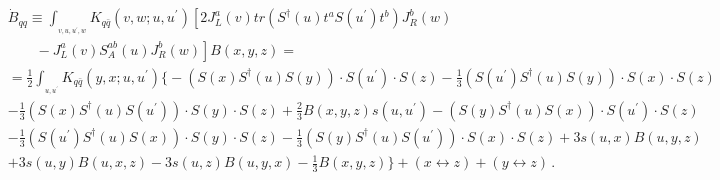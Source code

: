\documentclass[11pt,a4paper]{article}
\begin{document}
\begin{equation}\begin{split}
&
\dot B_{qq}\equiv
\int_{_{v,u,u^{\prime},w}}K_{q\bar{q}}(v,w;u,u^{\prime})\left[2J_{L}^{a}(v)tr\left(S^{\dagger}(u)t^{a}S(u^{\prime})t^{b}\right)J_{R}^{b}(w)\right.\\
&\left. \ \ \ \ \ \ \ \ \ -J_{L}^{a}(v)S_A^{ab}(u)J_{R}^{b}(w)\right]B(x,y,z)=\\
&=\frac{1}{2}\int_{_{u,u^{\prime}}}K_{q\bar{q}}(y,x;u,u^{\prime})\Big\{
-(S(x)S^{\dagger}(u)S(y))\cdot S(u^\prime)\cdot S(z) 
-\frac{1}{3}(S(u^{\prime})S^{\dagger}(u)S(y))\cdot S(x)\cdot S(z) \\
&-\frac{1}{3}(S(x)S^{\dagger}(u)S(u^{\prime}))\cdot S(y)\cdot S(z)
+\frac{2}{3}B(x,y,z)s(u,u^{\prime})
-(S(y)S^{\dagger}(u)S(x))\cdot S(u^\prime)\cdot S(z) \\
&-\frac{1}{3}(S(u^{\prime})S^{\dagger}(u)S(x))\cdot S(y)\cdot S(z) 
-\frac{1}{3}(S(y)S^{\dagger}(u)S(u^{\prime}))\cdot S(x)\cdot S(z)
+3s(u,x)B(u,y,z) \\
& +3s(u,y)B(u,x,z)-3s(u,z)B(u,y,x)-\frac{1}{3}B(x,y,z)\Big\} +(x\leftrightarrow z)+(y\leftrightarrow z)\,.\\
\end{split}\end{equation}
\end{document}
